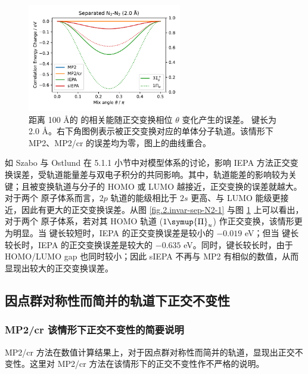 \begin{figure}[!ht]
  \centering
  \includegraphics[width=0.6\textwidth]{assets/invar-sep-N2-2.pdf}
  \caption[ 对称性简并轨道正交变换误差 (键长 2.0 \AA)]{距离 100 \AA 的  的相关能随正交变换相位 $\theta$ 变化产生的误差。 键长为 2.0 \AA。右下角图例表示被正交变换对应的单体分子轨道。该情形下 MP2、MP2/cr 的误差均为零，图上的曲线重合。}
  \label{fig.2.invar-sep-N2-2}
\end{figure}

如 Szabo 与 Ostlund 在 5.1.1 小节中对模型体系的讨论\cite{Szabo-Ostlund.Dover.1996}，影响 IEPA 方法正交变换误差，受轨道能量差与双电子积分的共同影响。其中，轨道能差的影响较为关键；且被变换轨道与分子的 HOMO 或 LUMO 越接近，正交变换的误差就越大。对于两个  原子体系而言，$2p$ 轨道的能级相比于 $2s$ 更高、与 LUMO 能级更接近，因此有更大的正交变换误差。从图 \ref{fig.2.invar-sep-N2-1} 与图 \ref{fig.2.invar-sep-N2-2} 上可以看出，对于两个  原子体系，若对其 HOMO 轨道 ($1 \symup{\Pi}_u$) 作正交变换，该情形更为明显。当  键长较短时，IEPA 的正交变换误差是较小的 $-0.019$ eV；但当  键长较长时，IEPA 的正交变换误差是较大的 $-0.635$ eV。同时，键长较长时，由于 HOMO/LUMO gap 也同时较小；因此 sIEPA 不再与 MP2 有相似的数值，从而显现出较大的正交变换误差。

\subsection{因点群对称性而简并的轨道下正交不变性}

\subsubsection{MP2/cr 该情形下正交不变性的简要说明}

MP2/cr 方法在数值计算结果上，对于因点群对称性而简并的轨道，显现出正交不变性。这里对 MP2/cr 方法在该情形下的正交不变性作不严格的说明。

